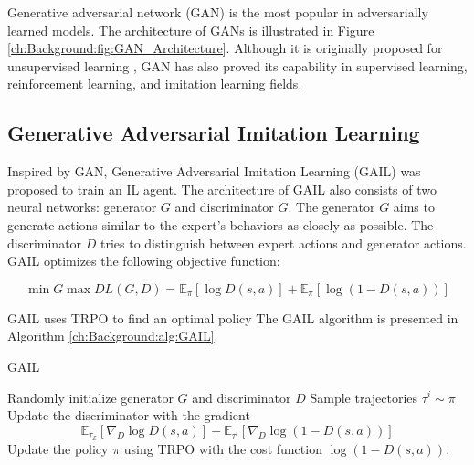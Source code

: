 Generative adversarial network (GAN) is the most popular in adversarially learned models.
The architecture of GANs is illustrated in Figure \ref{ch:Background:fig:GAN_Architecture}.
Although it is originally proposed for unsupervised learning \cite{GAN_CAPTCHA,GAN_ImageCompression,GAN_ImageTranslation},
GAN has also proved its capability in supervised learning, reinforcement learning, and imitation learning fields.


\subsection{Generative Adversarial Imitation Learning}

Inspired by GAN, Generative Adversarial Imitation Learning (GAIL) was proposed to train an IL agent.
The architecture of GAIL also consists of two neural networks: generator $G$ and discriminator $G$.
The generator $G$ aims to generate actions similar to the expert's behaviors as closely as possible.
The discriminator $D$ tries to distinguish between expert actions and generator actions.
GAIL optimizes the following objective function:

\[
  \min{G} \max{D} L(G, D) = \mathbb{E}_\pi[\log{D(s,a)}] + \mathbb{E}_\pi[\log{(1-D(s, a))}]
\]

GAIL uses TRPO \cite{RL_Algo_TRPO} to find an optimal policy
The GAIL algorithm is presented in Algorithm \ref{ch:Background:alg:GAIL}.

\begin{algorithm}
  \caption{GAIL\label{ch:Background:alg:GAIL}}

  \begin{algorithmic}[1]
    \Input
    \EndInput

    \State Randomly initialize generator $G$ and discriminator $D$
    \State Sample trajectories $\tau^i \sim \pi$
    \State Update the discriminator with the gradient
    \[
      \mathbb{E}_{\tau_\mathcal{E}}[\nabla_D \log{D(s,a)}] + \mathbb{E}_{\tau^i}[\nabla_D \log{(1 - D(s,a))}]
    \]
    \State Update the policy $\pi$ using TRPO with the cost function $\log(1-D(s,a))$.
    \EndFor
    \Output
    \EndOutput
  \end{algorithmic}
\end{algorithm}
